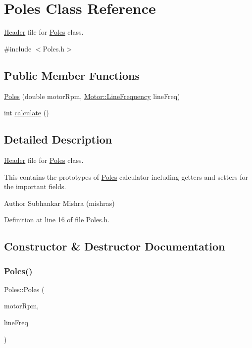 \hypertarget{class_poles}{}\section{Poles Class Reference}
\label{class_poles}


\hyperlink{class_header}{Header} file for \hyperlink{class_poles}{Poles} class.  




{\ttfamily \#include $<$Poles.\+h$>$}

\subsection*{Public Member Functions}
\begin{DoxyCompactItemize}
\item 
\hyperlink{class_poles_aade5d01dab7a461e582449e5bb17f6d6}{Poles} (double motor\+Rpm, \hyperlink{class_motor_acee1bdf1b684ad36cb80dc2829d9fcee}{Motor\+::\+Line\+Frequency} line\+Freq)
\item 
int \hyperlink{class_poles_a23988f68100374c8277dca81ab06f724}{calculate} ()
\end{DoxyCompactItemize}


\subsection{Detailed Description}
\hyperlink{class_header}{Header} file for \hyperlink{class_poles}{Poles} class. 

This contains the prototypes of \hyperlink{class_poles}{Poles} calculator including getters and setters for the important fields.

\begin{DoxyAuthor}{Author}
Subhankar Mishra (mishras) 
\end{DoxyAuthor}


Definition at line 16 of file Poles.\+h.



\subsection{Constructor \& Destructor Documentation}
\mbox{\label{class_poles_aade5d01dab7a461e582449e5bb17f6d6}} 
\subsubsection{\texorpdfstring{Poles()}{Poles()}}
{\footnotesize\ttfamily Poles\+::\+Poles (\begin{DoxyParamCaption}\item[{double}]{motor\+Rpm,  }\item[{\hyperlink{class_motor_acee1bdf1b684ad36cb80dc2829d9fcee}{Motor\+::\+Line\+Frequency}}]{line\+Freq }\end{DoxyParamCaption})\hspace{0.3cm}{\ttfamily [inline]}}

